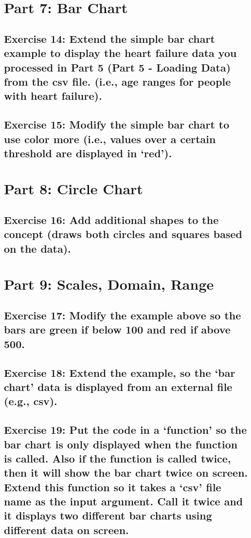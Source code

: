 \documentclass[11pt]{article}   	%
\begin{document}
\section{Part 7: Bar Chart}
\subsection{Exercise 14: Extend the simple bar chart example to display the heart failure data you processed in Part 5 (Part 5 -
Loading Data) from the csv file. (i.e., age ranges for people with heart failure).}
\subsection{Exercise 15: Modify the simple bar chart to use color more (i.e., values over a certain threshold are displayed in ‘red’).}

\section{Part 8: Circle Chart}
\subsection{Exercise 16: Add additional shapes to the concept (draws both circles and squares based on the data).}

\section{Part 9: Scales, Domain, Range}
\subsection{Exercise 17: Modify the example above so the bars are green if below 100 and red if above 500.}
\subsection{Exercise 18: Extend the example, so the ‘bar chart’ data is displayed from an external file (e.g., csv).}
\subsection{Exercise 19: Put the code in a ‘function’ so the bar chart is only displayed when the function is called. Also if the function is called twice, then it will show the bar chart twice on screen. Extend this function so it takes a ‘csv’ file name as the input argument. Call it twice and it displays two different bar charts using different data on screen.}
\end{document}
